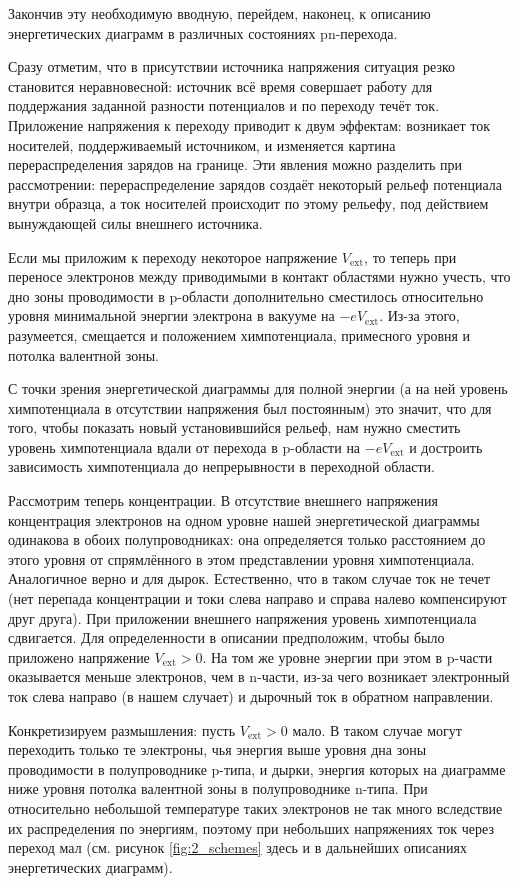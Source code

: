 \documentclass[a4paper, 12pt]{article}
\begin{document}
Закончив эту необходимую вводную, перейдем, наконец, к описанию энергетических диаграмм в различных состояниях pn-перехода.

Сразу отметим, что в присутствии источника напряжения ситуация резко становится неравновесной: источник всё время совершает работу для поддержания заданной разности потенциалов и по переходу течёт ток. Приложение напряжения к переходу приводит к двум эффектам: возникает ток носителей, поддерживаемый источником, и изменяется картина перераспределения зарядов на границе. Эти явления можно разделить при рассмотрении: перераспределение зарядов создаёт некоторый рельеф потенциала внутри образца, а ток носителей происходит по этому рельефу, под действием вынуждающей силы внешнего источника.

Если мы приложим к переходу некоторое напряжение $V_{\text{ext}}$, то теперь при переносе электронов между приводимыми в контакт областями нужно учесть, что дно зоны проводимости в p-области дополнительно сместилось относительно уровня минимальной энергии электрона в вакууме на $-eV_{\text{ext}}$. Из-за этого, разумеется, смещается и положением химпотенциала, примесного уровня и потолка валентной зоны.

С точки зрения энергетической диаграммы для полной энергии (а на ней уровень химпотенциала в отсутствии напряжения был постоянным) это значит, что для того, чтобы показать новый установившийся рельеф, нам нужно сместить уровень химпотенциала вдали от перехода в p-области на $-eV_{\text{ext}}$ и достроить зависимость химпотенциала до непрерывности в переходной области.

Рассмотрим теперь концентрации. В отсутствие внешнего напряжения концентрация электронов на одном уровне нашей энергетической диаграммы одинакова в обоих полупроводниках: она определяется только расстоянием до этого уровня от спрямлённого в этом представлении уровня химпотенциала. Аналогичное верно и для дырок. Естественно, что в таком случае ток не течет (нет перепада концентрации и токи слева направо и справа налево компенсируют друг друга). При приложении внешнего напряжения уровень химпотенциала сдвигается. Для определенности в описании предположим, чтобы было приложено напряжение $V_{\text{ext}} > 0$. На том же уровне энергии при этом в p-части оказывается меньше электронов, чем в n-части, из-за чего возникает электронный ток слева направо (в нашем случает) и дырочный ток в обратном направлении.

Конкретизируем размышления: пусть $V_{\text{ext}} > 0$ мало. В таком случае могут переходить только те электроны, чья энергия выше уровня дна зоны проводимости в полупроводнике p-типа, и дырки, энергия которых на диаграмме ниже уровня потолка валентной зоны в полупроводнике n-типа. При относительно небольшой температуре таких электронов не так много вследствие их распределения по энергиям, поэтому при небольших напряжениях ток через переход мал (см. рисунок \ref{fig:2_schemes} здесь и в дальнейших описаниях энергетических диаграмм).
\end{document}
